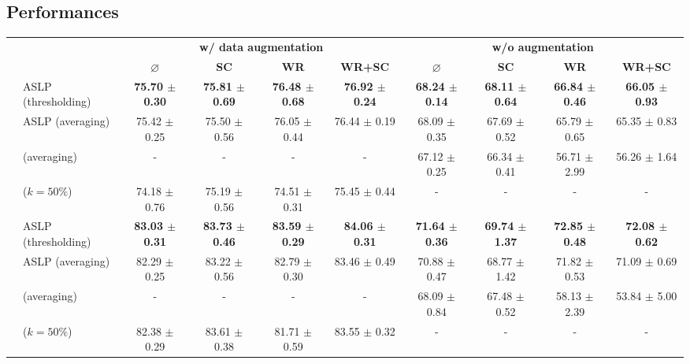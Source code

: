 \subsection{Performances}

\begin{table}
  \centering
  \resizebox{16.5cm}{!} {
    \begin{tabular}{llcccccccc}
      \cmidrule[\heavyrulewidth]{3-10}
        &  & \multicolumn{4}{c}{\textbf{w/ data augmentation}} & \multicolumn{4}{c}{\textbf{w/o augmentation}} \\
       &  &  $\varnothing$ & \textbf{SC} & \textbf{WR} & \textbf{WR+SC} & $\varnothing$ & \textbf{SC} & \textbf{WR} & \textbf{WR+SC} \\
      \toprule

      \multirow{12}{*}{} \multirow{4}{*}{\textbf{Conv2}} & ASLP (thresholding) & \textbf{75.70 $\pm$ 0.30} & \textbf{75.81 $\pm$ 0.69} & \textbf{76.48 $\pm$ 0.68} & \textbf{76.92 $\pm$ 0.24} & \textbf{68.24 $\pm$ 0.14} &\textbf{ 68.11 $\pm$ 0.64} & \textbf{66.84 $\pm$ 0.46} & \textbf{66.05 $\pm$ 0.93} \\
        & ASLP (averaging)& 75.42 $\pm$ 0.25 & 75.50 $\pm$ 0.56 & 76.05 $\pm$ 0.44 & 76.44 $\pm$ 0.19 & 68.09 $\pm$ 0.35 & 67.69 $\pm$ 0.52 & 65.79 $\pm$ 0.65 & 65.35 $\pm$ 0.83 \\
        & \cite{DBLP:conf/nips/ZhouLLY19} (averaging)& - & - & - & - & 67.12 $\pm$ 0.25 & 66.34 $\pm$ 0.41 & 56.71 $\pm$ 2.99 & 56.26 $\pm$ 1.64 \\
        & \cite{DBLP:conf/cvpr/RamanujanWKFR20} ($k=50\%$) & 74.18 $\pm$ 0.76 & 75.19 $\pm$ 0.56 & 74.51 $\pm$ 0.31 & 75.45 $\pm$ 0.44 & - & - & - & - \\
      \midrule

       \multirow{4}{*}{\textbf{Conv4}} & ASLP (thresholding) & \textbf{83.03 $\pm$ 0.31} & \textbf{83.73 $\pm$ 0.46} & \textbf{83.59 $\pm$ 0.29} & \textbf{84.06 $\pm$ 0.31} & \textbf{71.64 $\pm$ 0.36} & \textbf{69.74 $\pm$ 1.37} & \textbf{72.85 $\pm$ 0.48} & \textbf{72.08 $\pm$ 0.62} \\
        & ASLP (averaging)& 82.29 $\pm$ 0.25 & 83.22 $\pm$ 0.56 & 82.79 $\pm$ 0.30 & 83.46 $\pm$ 0.49 & 70.88 $\pm$ 0.47 & 68.77 $\pm$ 1.42 & 71.82 $\pm$ 0.53 & 71.09 $\pm$ 0.69 \\
        & \cite{DBLP:conf/nips/ZhouLLY19} (averaging)& - & - & - & - & 68.09 $\pm$ 0.84 & 67.48 $\pm$ 0.52 & 58.13 $\pm$ 2.39 & 53.84 $\pm$ 5.00 \\
        & \cite{DBLP:conf/cvpr/RamanujanWKFR20} ($k=50\%$) & 82.38 $\pm$ 0.29 & 83.61 $\pm$ 0.38 & 81.71 $\pm$ 0.59 & 83.55 $\pm$ 0.32 & - & - & - & - \\
      \midrule


\end{tabular}}
\end{table}
